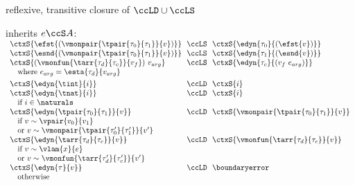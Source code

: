 \begin{flushleft}
\begin{minipage}[t]{\columnwidth}
\vspace{6em}

 reflexive, transitive closure of $\ccLD \cup \ccLS$
\end{minipage}%
\begin{minipage}[t]{\columnwidth}
 inherits $e \ccS A$:\\
$\begin{array}{l@{~~}c@{~~}l}
  \ctxS{\efst{(\vmonpair{\tpair{\tau_0}{\tau_1}}{v})}} & \ccLS & \ctxS{\edyn{\tau_0}{(\efst{v})}}
\\
  \ctxS{\esnd{(\vmonpair{\tpair{\tau_0}{\tau_1}}{v})}} & \ccLS & \ctxS{\edyn{\tau_1}{(\esnd{v})}}
\\
  \ctxS{(\vmonfun{\tarr{\tau_d}{\tau_c}}{v_f})~v_{arg}} & \ccLS & \ctxS{\edyn{\tau_c}{(v_f~e_{arg})}}
\\ \multicolumn{3}{l}{\mbox{\quad where $e_{arg} = \esta{\tau_d}{v_{arg}}$}}
\\[0.8ex]
  \ctxS{\edyn{\tint}{i}} & \ccLD & \ctxS{i}
\\
  \ctxS{\edyn{\tnat}{i}} & \ccLD & \ctxS{i}
\\ \multicolumn{3}{l}{\mbox{\quad if $i \in \naturals$}}
\\
  \ctxS{\edyn{\tpair{\tau_0}{\tau_1}}{v}} & \ccLD & \ctxS{\vmonpair{\tpair{\tau_0}{\tau_1}}{v}}
\\ \multicolumn{3}{l}{\mbox{\quad if $v \sim \vpair{v_0}{v_1}$}}
\\ \multicolumn{3}{l}{\mbox{\quad or $v \sim \vmonpair{\tpair{\tau_0'}{\tau_1'}}{v'}$}}
\\
  \ctxS{\edyn{\tarr{\tau_d}{\tau_c}}{v}} & \ccLD & \ctxS{\vmonfun{\tarr{\tau_d}{\tau_c}}{v}}
\\ \multicolumn{3}{l}{\mbox{\quad if $v \sim \vlam{x}{e}$}}
\\ \multicolumn{3}{l}{\mbox{\quad or $v \sim \vmonfun{\tarr{\tau_d'}{\tau_c'}}{v'}$}}
\\
  \ctxS{\edyn{\tau}{v}} & \ccLD & \boundaryerror
\\ \multicolumn{3}{l}{\mbox{\quad otherwise}}
\end{array}$
\end{minipage}

\end{flushleft}
